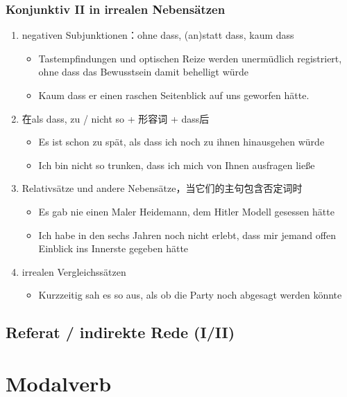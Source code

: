 \documentclass[UTF8]{report}
\begin{document}
\subsubsection{Konjunktiv II in irrealen Nebensätzen}
\begin{enumerate}
    \item negativen Subjunktionen：ohne dass, (an)statt dass, kaum dass
    \begin{itemize}
        \item Tastempfindungen und optischen Reize werden unermüdlich registriert, ohne dass das Bewusstsein damit behelligt würde
        \item Kaum dass er einen raschen Seitenblick auf uns geworfen hätte.
    \end{itemize}
    \item 在als dass, zu / nicht so + 形容词 + dass后
    \begin{itemize}
        \item Es ist schon zu spät, als dass ich noch zu ihnen hinausgehen würde
        \item Ich bin nicht so trunken, dass ich mich von Ihnen ausfragen ließe
    \end{itemize}
    \item Relativsätze und andere Nebensätze，当它们的主句包含否定词时
    \begin{itemize}
        \item Es gab nie einen Maler Heidemann, dem Hitler Modell gesessen hätte
        \item  Ich habe in den sechs Jahren noch nicht erlebt, dass mir jemand offen Einblick ins Innerste gegeben hätte
    \end{itemize}
    \item irrealen Vergleichssätzen
    \begin{itemize}
        \item Kurzzeitig sah es so aus, als ob die Party noch abgesagt werden könnte
    \end{itemize}
\end{enumerate}

\subsection{Referat / indirekte Rede (I/II)}



\section{Modalverb}
\end{document}
